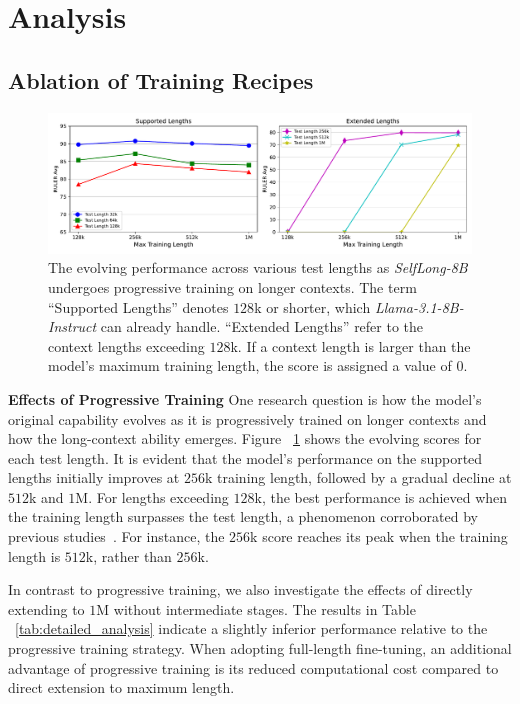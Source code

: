 \documentclass{article}
\begin{document}
\section{Analysis}

\subsection{Ablation of Training Recipes}

\begin{figure}[ht]
\centering
\includegraphics[width=1.0\textwidth]{progressive_results}
\caption{The evolving performance across various test lengths as \emph{SelfLong-8B} undergoes progressive training on longer contexts.
The term ``Supported Lengths'' denotes $128$k or shorter,
which \emph{Llama-3.1-8B-Instruct} can already handle.
``Extended Lengths'' refer to the context lengths exceeding $128$k.
If a context length is larger than the model's maximum training length,
the score is assigned a value of $0$.}
\label{fig:progressive}
\end{figure}

\noindent
\textbf{Effects of Progressive Training }
One research question is how the model's original capability evolves as it is progressively trained on longer contexts
and how the long-context ability emerges.
Figure ~\ref{fig:progressive} shows the evolving scores for each test length.
It is evident that the model's performance on the supported lengths initially improves at $256$k training length,
followed by a gradual decline at $512$k and $1$M.
For lengths exceeding $128$k,
the best performance is achieved when the training length surpasses the test length,
a phenomenon corroborated by previous studies~\citep{gao2024train}.
For instance,
the $256$k score reaches its peak when the training length is $512$k,
rather than $256$k.

In contrast to progressive training,
we also investigate the effects of directly extending to $1$M without intermediate stages.
The results in Table ~\ref{tab:detailed_analysis} indicate a slightly inferior performance relative to the progressive training strategy.
When adopting full-length fine-tuning,
an additional advantage of progressive training is its reduced computational cost
compared to direct extension to maximum length.
\end{document}
